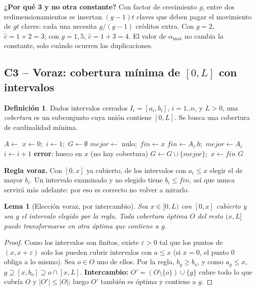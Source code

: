 \documentclass[11pt,letterpaper]{article}
\theoremstyle{plain}
\newtheorem{lema}{Lema}
\theoremstyle{definition}
\newtheorem{definicion}{Definición}
\newcommand{\Th}{\Theta}
\newcommand{\cajah}[1]{\par\smallskip\colorbox{fondo}{\parbox{\dimexpr\linewidth-2\fboxsep}{\small #1}}\par\smallskip}
\begin{document}
\cajah{\textbf{¿Por qué 3 y no otra constante?} Con factor de crecimiento $g$, entre dos
redimensionamientos se insertan $(g-1)t$ claves que deben pagar el movimiento de $gt$ claves:
cada una necesita $g/(g-1)$ créditos extra. Con $g=2$, $\hat c=1+2=3$; con $g=1{,}5$, $\hat c=1+3=4$.
El valor de $\alpha_{\max}$ no cambia la constante, solo cuándo ocurren las duplicaciones.}

\subsection{C3 -- Voraz: cobertura mínima de \texorpdfstring{$[0,L]$}{[0, L]} con intervalos}

\begin{definicion}
Dados intervalos cerrados $I_i=[a_i,b_i]$, $i=1..n$, y $L>0$, una \emph{cobertura} es un subconjunto
cuya unión contiene $[0,L]$. Se busca una cobertura de cardinalidad mínima.
\end{definicion}

\begin{algorithm}[H]
\caption{\textsc{CoberturaMínima}$(I, L)$ -- archivo \texttt{c3\_cobertura\_intervalos/cobertura.py}}
\begin{algorithmic}[1]
\State $A\gets$  \Comment{$\Th(n\log n)$}
\State $x\gets0$;\ $i\gets1$;\ $G\gets\emptyset$ 
  \State $mejor\gets$ nulo;\ $fin\gets x$
   
      $fin\gets A_i.b$;\ $mejor\gets A_i$ \EndIf
     \State $i\gets i+1$ 
  \EndWhile
   \textbf{error}: hueco en $x$ (no hay cobertura) \EndIf
  \State $G\gets G\cup\{mejor\}$;\ $x\gets fin$ 
\EndWhile
\State \Return $G$
\end{algorithmic}
\end{algorithm}

\textbf{Regla voraz.} Con $[0,x]$ ya cubierto, de los intervalos con $a_i\le x$ elegir el de mayor
$b_i$. Un intervalo examinado y no elegido tiene $b_i\le fin$, así que nunca servirá más adelante:
por eso es correcto no volver a mirarlo.

\begin{lema}[Elección voraz, por intercambio]\label{lem:intercambio}
Sea $x\in[0,L)$ con $[0,x]$ cubierto y sea $g$ el intervalo elegido por la regla. Toda cobertura
óptima $O$ del resto $(x,L]$ puede transformarse en otra óptima que contiene a $g$.
\end{lema}
\begin{proof}
Como los intervalos son finitos, existe $\varepsilon>0$ tal que los puntos de $(x,x+\varepsilon)$ solo
los pueden cubrir intervalos con $a\le x$ (si $x=0$, el punto $0$ obliga a lo mismo). Sea $o\in O$ uno de
ellos. Por la regla, $b_g\ge b_o$, y como $a_g\le x$, $g\supseteq [x,b_o]\supseteq o\cap[x,L]$.
\textbf{Intercambio:} $O'=(O\setminus\{o\})\cup\{g\}$ cubre todo lo que cubría $O$ y $|O'|\le|O|$;
luego $O'$ también es óptima y contiene a $g$.
\end{proof}
\end{document}
